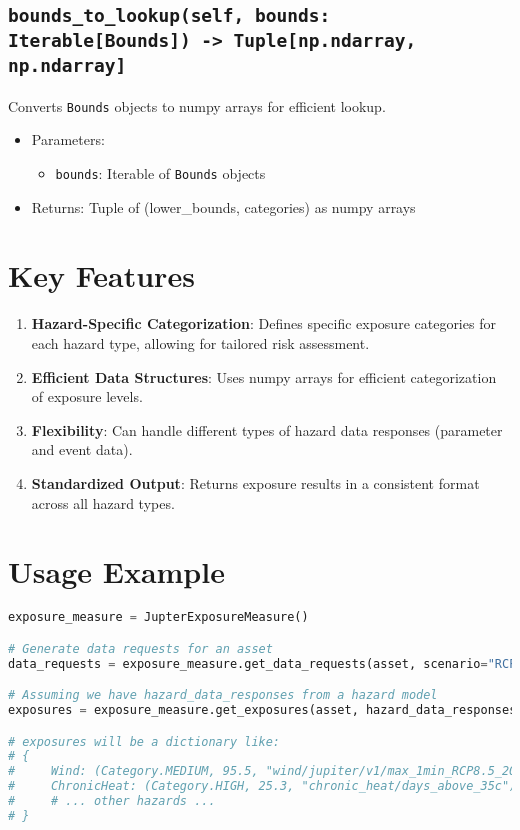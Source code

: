 \documentclass{article}
\begin{document}
\subsection{\texttt{bounds\_to\_lookup(self, bounds: Iterable[Bounds]) -> Tuple[np.ndarray, np.ndarray]}}
Converts \texttt{Bounds} objects to numpy arrays for efficient lookup.

\begin{itemize}
    \item Parameters:
    \begin{itemize}
        \item \texttt{bounds}: Iterable of \texttt{Bounds} objects
    \end{itemize}
    \item Returns: Tuple of (lower\_bounds, categories) as numpy arrays
\end{itemize}

\section{Key Features}

\begin{enumerate}
    \item \textbf{Hazard-Specific Categorization}: 
    Defines specific exposure categories for each hazard type, allowing for tailored risk assessment.

    \item \textbf{Efficient Data Structures}: 
    Uses numpy arrays for efficient categorization of exposure levels.

    \item \textbf{Flexibility}: 
    Can handle different types of hazard data responses (parameter and event data).

    \item \textbf{Standardized Output}: 
    Returns exposure results in a consistent format across all hazard types.
\end{enumerate}

\section{Usage Example}

\begin{lstlisting}[language=Python]
exposure_measure = JupterExposureMeasure()

# Generate data requests for an asset
data_requests = exposure_measure.get_data_requests(asset, scenario="RCP8.5", year=2050)

# Assuming we have hazard_data_responses from a hazard model
exposures = exposure_measure.get_exposures(asset, hazard_data_responses)

# exposures will be a dictionary like:
# {
#     Wind: (Category.MEDIUM, 95.5, "wind/jupiter/v1/max_1min_RCP8.5_2050"),
#     ChronicHeat: (Category.HIGH, 25.3, "chronic_heat/days_above_35c"),
#     # ... other hazards ...
# }
\end{lstlisting}
\end{document}
